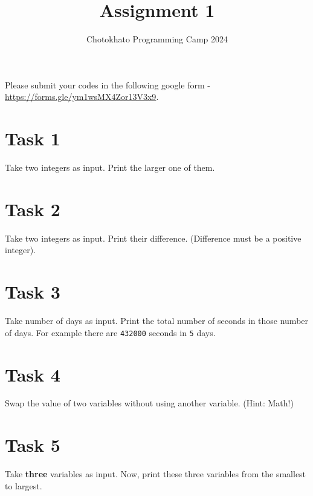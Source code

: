 \documentclass{article}
\title{Assignment 1}
\author{Chotokhato Programming Camp 2024}
\begin{document}
\maketitle

Please submit your codes in the following google form - \url{https://forms.gle/ym1wsMX4Zor13V3x9}.

\section*{Task 1} 
Take two integers as input. Print the larger one of them.

\section*{Task 2}
Take two integers as input. Print their difference. (Difference must be a positive integer).

\section*{Task 3}
Take number of days as input. Print the total number of seconds in those number of days. For example there are \verb|432000| seconds in \verb|5| days.

\section*{Task 4}
Swap the value of two variables without using another variable. (Hint: Math!)

\section*{Task 5}
Take \textbf{three} variables as input. Now, print these three variables from the smallest to largest.
\end{document}
